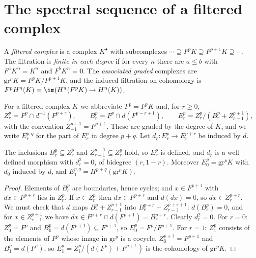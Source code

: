 \section{The spectral sequence of a filtered complex}\label{homological-algebra:section-filtered-complex}

\begin{definition}\label{homological-algebra:definition-filtered-complex}
A \emph{filtered complex} is a complex $K^\bullet$ with subcomplexes $\cdots \supseteq F^pK \supseteq F^{p+1}K \supseteq \cdots$. The
filtration is \emph{finite in each degree} if for every $n$ there are $a \leq b$ with $F^aK^n = K^n$ and $F^bK^n = 0$. The
\emph{associated graded} complexes are $\mathrm{gr}^pK = F^pK/F^{p+1}K$, and the induced filtration on cohomology is
$F^pH^n(K) = \im(H^n(F^pK) \to H^n(K))$.
\end{definition}

\begin{definition}\label{homological-algebra:definition-z-b}
For a filtered complex $K$ we abbreviate $F^p = F^pK$ and, for $r \geq 0$,
\[
Z_r^p = F^p \cap d^{-1}(F^{p+r}), \qquad B_r^p = F^p \cap d(F^{p-r+1}), \qquad
E_r^p = Z_r^p/(B_r^p + Z_{r-1}^{p+1}),
\]
with the convention $Z_{-1}^{p+1} = F^{p+1}$. These are graded by the degree of $K$, and we write $E_r^{p,q}$ for the part of $E_r^p$ in
degree $p + q$. Let $d_r \colon E_r^p \to E_r^{p+r}$ be induced by $d$.
\end{definition}

\begin{lemma}\label{homological-algebra:lemma-well-defined}
The inclusions $B_r^p \subseteq Z_r^p$ and $Z_{r-1}^{p+1} \subseteq Z_r^p$ hold, so $E_r^p$ is defined, and $d_r$ is a well-defined
morphism with $d_r^2 = 0$, of bidegree $(r, 1 - r)$. Moreover $E_0^p = \mathrm{gr}^pK$ with $d_0$ induced by $d$, and
$E_1^{p,q} = H^{p+q}(\mathrm{gr}^pK)$.
\end{lemma}

\begin{proof}
Elements of $B_r^p$ are boundaries, hence cycles; and $x \in F^{p+1}$ with $dx \in F^{p+r}$ lies in $Z_r^p$. If $x \in Z_r^p$ then
$dx \in F^{p+r}$ and $d(dx) = 0$, so $dx \in Z_r^{p+r}$. We must check that $d$ maps $B_r^p + Z_{r-1}^{p+1}$ into
$B_r^{p+r} + Z_{r-1}^{p+r+1}$: $d(B_r^p) = 0$, and for $x \in Z_{r-1}^{p+1}$ we have $dx \in F^{p+r} \cap d(F^{p+1}) = B_r^{p+r}$.
Clearly $d_r^2 = 0$. For $r = 0$: $Z_0^p = F^p$ and $B_0^p = d(F^{p+1}) \subseteq F^{p+1}$, so $E_0^p = F^p/F^{p+1}$. For $r = 1$:
$Z_1^p$ consists of the elements of $F^p$ whose image in $\mathrm{gr}^p$ is a cocycle, $Z_0^{p+1} = F^{p+1}$ and $B_1^p = d(F^p)$, so
$E_1^p = Z_1^p/(d(F^p) + F^{p+1})$ is the cohomology of $\mathrm{gr}^pK$.
\end{proof}


